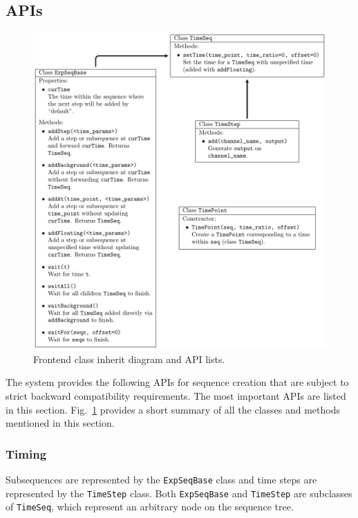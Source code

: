 \subsection{APIs}
\label{ch:computer-control:frontend:api}
\begin{figure}
  \centering
  \includegraphics[width=\textwidth]{figures/computer_control_frontend_classes.pdf}
  \caption[Frontend API classes]{
    Frontend class inherit diagram and API lists.
    \label{fig:computer-control:frontend:classes}}
\end{figure}

The system provides the following APIs for sequence creation
that are subject to strict backward compatibility requirements.
The most important APIs are listed in this section.
Fig.~\ref{fig:computer-control:frontend:classes}
provides a short summary of all the classes and methods mentioned in this section.

\subsubsection{Timing}
Subsequences are represented by the \verb`ExpSeqBase` class
and time steps are represented by the \verb`TimeStep` class.
Both \verb`ExpSeqBase` and \verb`TimeStep` are subclasses of \verb`TimeSeq`,
which represent an arbitrary node on the sequence tree.

